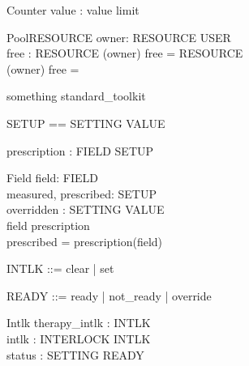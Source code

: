 \documentclass{llncs}
\begin{document}
\begin{schema}{Counter}
value : \nat
\where
value \leq limit
\end{schema}

\begin{genschema}{Pool}{RESOURCE}
owner: RESOURCE \pfun USER \\
free : \power RESOURCE
\where
(\dom owner) \uni free = RESOURCE \\
(\dom owner) \int free = \emptyset
\end{genschema}



\begin{zsection}
\SECTION something \parents standard\_toolkit
\end{zsection}

\begin{zed}
\end{zed}
\begin{zed}
SETUP == SETTING \fun VALUE
\end{zed}
\begin{axdef}
prescription : FIELD \pfun SETUP
\end{axdef}


\begin{schema}{Field}
field: FIELD \\
measured, prescribed: SETUP \\
overridden : SETTING \pfun VALUE \\
\where field \in \dom prescription \\
prescribed = prescription(field)
\end{schema}

\begin{zed}
[INTERLOCK]
\end{zed}
\begin{zed}
INTLK ::= clear | set
\end{zed}
\begin{zed}
READY ::= ready | not\_ready | override
\end{zed}

\begin{schema}{Intlk}
therapy\_intlk : INTLK \\
intlk : INTERLOCK \fun INTLK \\
status : SETTING \fun READY
\end{schema}
\end{document}
